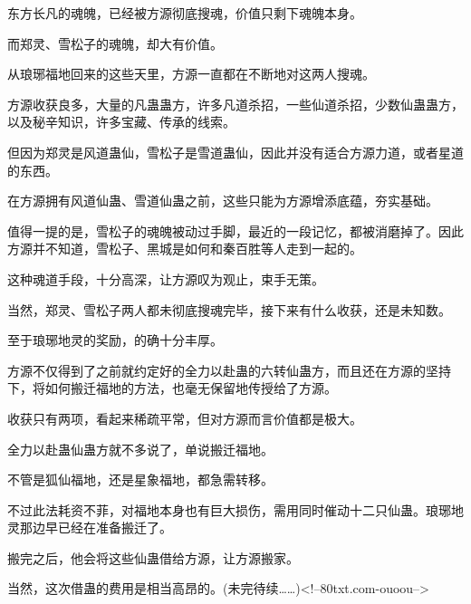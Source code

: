 \begin{this_body}
东方长凡的魂魄，已经被方源彻底搜魂，价值只剩下魂魄本身。

而郑灵、雪松子的魂魄，却大有价值。

从琅琊福地回来的这些天里，方源一直都在不断地对这两人搜魂。

方源收获良多，大量的凡蛊蛊方，许多凡道杀招，一些仙道杀招，少数仙蛊蛊方，以及秘辛知识，许多宝藏、传承的线索。

但因为郑灵是风道蛊仙，雪松子是雪道蛊仙，因此并没有适合方源力道，或者星道的东西。

在方源拥有风道仙蛊、雪道仙蛊之前，这些只能为方源增添底蕴，夯实基础。

值得一提的是，雪松子的魂魄被动过手脚，最近的一段记忆，都被消磨掉了。因此方源并不知道，雪松子、黑城是如何和秦百胜等人走到一起的。

这种魂道手段，十分高深，让方源叹为观止，束手无策。

当然，郑灵、雪松子两人都未彻底搜魂完毕，接下来有什么收获，还是未知数。

至于琅琊地灵的奖励，的确十分丰厚。

方源不仅得到了之前就约定好的全力以赴蛊的六转仙蛊方，而且还在方源的坚持下，将如何搬迁福地的方法，也毫无保留地传授给了方源。

收获只有两项，看起来稀疏平常，但对方源而言价值都是极大。

全力以赴蛊仙蛊方就不多说了，单说搬迁福地。

不管是狐仙福地，还是星象福地，都急需转移。

不过此法耗资不菲，对福地本身也有巨大损伤，需用同时催动十二只仙蛊。琅琊地灵那边早已经在准备搬迁了。

搬完之后，他会将这些仙蛊借给方源，让方源搬家。

当然，这次借蛊的费用是相当高昂的。(未完待续……)<!--80txt.com-ouoou-->

\end{this_body}

